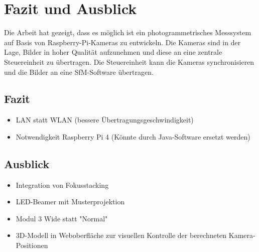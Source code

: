\documentclass[./00PhotoBox.tex]{subfiles}
\begin{document}
\chapter{Fazit und Ausblick}

Die Arbeit hat gezeigt, dass es möglich ist ein photogrammetrisches Messsystem auf Basis von Raspberry-Pi-Kameras zu entwickeln. Die Kameras sind in der Lage, Bilder in hoher Qualität aufzunehmen und diese an eine zentrale Steuereinheit zu übertragen. Die Steuereinheit kann die Kameras synchronisieren und die Bilder an eine \gls{SfM}-Software übertragen.

\section{Fazit}
\begin{itemize}
    \item LAN statt WLAN (bessere Übertragungsgeschwindigkeit)
    \item Notwendigkeit Raspberry Pi 4 (Könnte durch Java-Software ersetzt werden)
\end{itemize}

\section{Ausblick}
\label{s:ausblick}
\begin{itemize}
    \item Integration von Fokusstacking
    \item LED-Beamer mit Musterprojektion
    \item Modul 3 Wide statt "Normal"
    \item 3D-Modell in Weboberfläche zur visuellen Kontrolle der berechneten Kamera-Positionen
\end{itemize}

\biblio
\end{document}

